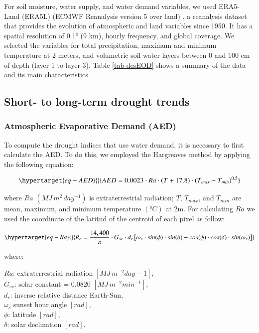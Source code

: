 \documentclass[
  authoryear,
  preprint,
  3p,
  onecolumn]{elsarticle}
\begin{document}
For soil moisture, water supply, and water demand variables, we used
ERA5-Land (ERA5L) (ECMWF Reanalysis version 5 over land)
\citep{MunozSabater2021}, a reanalysis dataset that provides the
evolution of atmospheric and land variables since 1950. It has a spatial
resolution of 0.1° (9 km), hourly frequency, and global coverage. We
selected the variables for total precipitation, maximum and minimum
temperature at 2 meters, and volumetric soil water layers between 0 and
100 cm of depth (layer 1 to layer 3). Table \ref{tab-desEOD} shows a
summary of the data and its main characteristics.

\hypertarget{short--to-long-term-drought-trends}{%
\subsection{Short- to long-term drought
trends}\label{short--to-long-term-drought-trends}}

\hypertarget{atmospheric-evaporative-demand-aed}{%
\subsubsection{Atmospheric Evaporative Demand
(AED)}\label{atmospheric-evaporative-demand-aed}}

To compute the drought indices that use water demand, it is necessary to
first calculate the AED. To do this, we employed the Hargreaves method
\citep{Hargreaves1994, Hargreaves1985} by applying the following
equation:

\begin{equation}\protect\hypertarget{eq-AED}{}{AED = 0.0023\cdot Ra\cdot (T+17.8)\cdot (T_{max}-T_{min})^{0.5}}\label{eq-AED}\end{equation}

where \(Ra\) \((MJ\,m^2\, day^{-1})\) is extraterrestrial radiation;
\(T\), \(T_{max}\), and \(T_{min}\) are mean, maximum, and minimum
temperature \((°C)\) at 2m. For calculating \(Ra\) we used the
coordinate of the latitud of the centroid of each pixel as follow:

\begin{equation}\protect\hypertarget{eq-Ra}{}{R_a = \frac{14,400}{\pi}\cdot G_{sc}\cdot d_r \left[\omega_s\cdot sin(\phi)\cdot sin(\delta)+cos(\phi)\cdot cos(\delta)\cdot sin(\omega_s) \right]}\label{eq-Ra}\end{equation}

where:

\(Ra\): extraterrestrial radiation \([MJ\, m^{-2} day-1]\),\\
\(G_{sc}\): solar constant = 0.0820 \([MJ\,m^{-2} min^{-1}]\),\\
\(d_r\): inverse relative distance Earth-Sun,\\
\(\omega_s\) sunset hour angle \([rad]\),\\
\(\phi\): latitude \([rad]\),\\
\(\delta\): solar declination \([rad]\).
\end{document}
